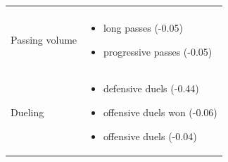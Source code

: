 \begin{longtable}{p{2.6cm}p{13cm}}
\begin{itemize}[nosep,leftmargin=1.1em,topsep=1pt]
  \end{itemize}\\
Passing volume & \begin{itemize}[nosep,leftmargin=1.1em,topsep=1pt]
    \item long passes (-0.05)
    \item progressive passes (-0.05)
  \end{itemize}\\
Dueling & \begin{itemize}[nosep,leftmargin=1.1em,topsep=1pt]
    \item defensive duels (-0.44)
    \item offensive duels won (-0.06)
    \item offensive duels (-0.04)
  \end{itemize}\\[8pt]
\end{longtable}

